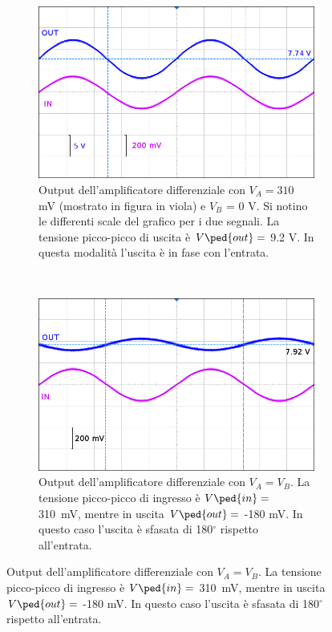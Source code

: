\begin{figure}
    \begin{subfigure}[t]{0.48\textwidth}
        \includegraphics[width=\textwidth]{f1.png}
        \caption{Output dell'amplificatore differenziale con $V_A = 310$ mV (mostrato in figura in viola) e $V_B$ = 0 V.
            Si notino le differenti scale del grafico per i due segnali.
            La tensione picco-picco di uscita è $V\ped{out} = $ 9.2 V. In questa modalità l'uscita è in fase con l'entrata.}
        \label{fig:f1}
    \end{subfigure}
    ~
    \begin{subfigure}[t]{0.48\textwidth}
        \includegraphics[width=\textwidth]{f2.png}
        \caption{Output dell'amplificatore differenziale con $V_A = V_B$. La tensione picco-picco di ingresso
        è $V\ped{in} =$ \SI{310}{\milli\volt}, mentre in uscita $V\ped{out} = $ -180 mV. In questo caso l'uscita è sfasata di 180$^\circ$ rispetto all'entrata.}
        \label{fig:f2}
    \end{subfigure}

\end{figure}
